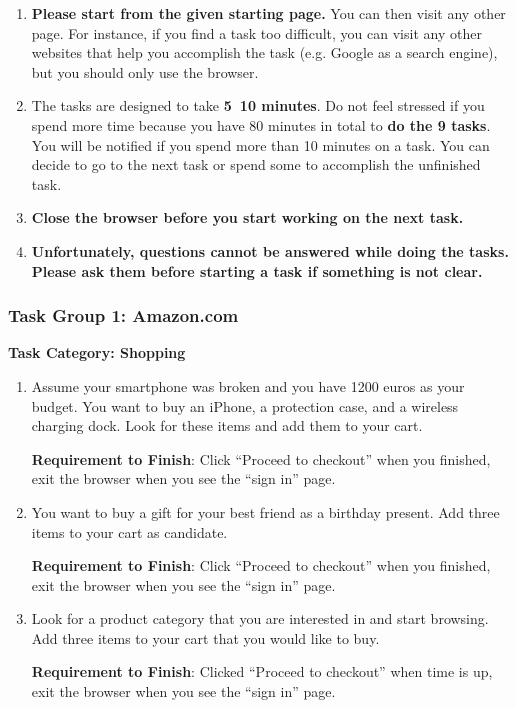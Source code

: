 \begin{enumerate}
    \item \textbf{Please start from the given starting page.} You can then visit any other page. 
          For instance, if you find a task too difficult, you can visit any other websites 
          that help you accomplish the task (e.g. Google as a search engine), but you 
          should only use the browser.
    \item The tasks are designed to take \textbf{5~10 minutes}. Do not feel stressed if you spend 
          more time because you have 80 minutes in total to \textbf{do the 9 tasks}. You will 
          be notified if you spend more than 10 minutes on a task. You can decide to go to 
          the next task or spend some to accomplish the unfinished task. 
    \item \textbf{Close the browser before you start working on the next task.}
    \item \textbf{Unfortunately, questions cannot be answered while doing the tasks.
          Please ask them before starting a task if something is not clear. }
\end{enumerate}

\subsubsection{Task Group 1: Amazon.com}

\textbf{Task Category: Shopping}

\begin{enumerate}
    \item Assume your smartphone was broken and you have 1200 euros 
          as your budget. You want to buy an iPhone, a protection case, and a wireless 
          charging dock. Look for these items and add them to your cart.

          \textbf{Requirement to Finish}: Click ``Proceed to checkout'' when you finished, exit the browser when you see the ``sign in'' page.
    \item You want to buy a gift for your best friend as a birthday present.
          Add three items to your cart as candidate.
    
          \textbf{Requirement to Finish}: Click ``Proceed to checkout'' when you finished, exit the browser when you see the ``sign in'' page.
    \item Look for a product category that you are interested in and start browsing. Add three items to your cart that you would like to buy. 
           
          \textbf{Requirement to Finish}: Clicked ``Proceed to checkout'' when time is up, exit the browser when you see the ``sign in'' page.
\end{enumerate}

